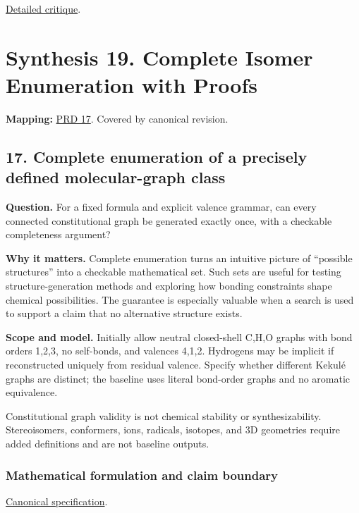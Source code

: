 \documentclass[
  11pt,
]{article}
\begin{document}
\href{https://github.com/rick-stevens-ai/Pure-Thought/blob/main/reviews/18-Optimal-Transport-Chemistry.md}{Detailed
critique}.

\section{Synthesis 19. Complete Isomer Enumeration with Proofs}

\textbf{Mapping:}
\href{https://github.com/rick-stevens-ai/Pure-Thought/blob/main/PRDs/17-Isomer-Enumeration-Molecular-Graphs.md}{PRD
17}. Covered by canonical revision.

\subsection{17. Complete enumeration of a precisely defined
molecular-graph class}

\textbf{Question.} For a fixed formula and explicit valence grammar, can
every connected constitutional graph be generated exactly once, with a
checkable completeness argument?

\textbf{Why it matters.} Complete enumeration turns an intuitive picture
of ``possible structures'' into a checkable mathematical set. Such sets
are useful for testing structure-generation methods and exploring how
bonding constraints shape chemical possibilities. The guarantee is
especially valuable when a search is used to support a claim that no
alternative structure exists.

\textbf{Scope and model.} Initially allow neutral closed-shell C,H,O
graphs with bond orders 1,2,3, no self-bonds, and valences 4,1,2.
Hydrogens may be implicit if reconstructed uniquely from residual
valence. Specify whether different Kekulé graphs are distinct; the
baseline uses literal bond-order graphs and no aromatic equivalence.

Constitutional graph validity is not chemical stability or
synthesizability. Stereoisomers, conformers, ions, radicals, isotopes,
and 3D geometries require added definitions and are not baseline
outputs.

\subsubsection{Mathematical formulation and claim boundary}

\href{https://github.com/rick-stevens-ai/Pure-Thought/blob/main/PRDs/17-Isomer-Enumeration-Molecular-Graphs.md}{Canonical
specification}.
\end{document}
